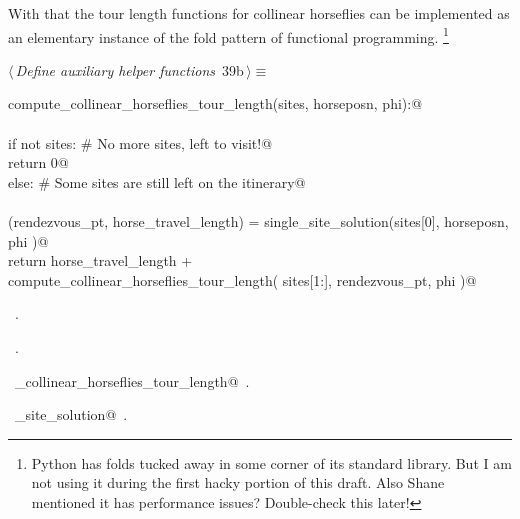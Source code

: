 \documentclass[11.5pt]{report}
\begin{document}
\vspace{-0.8cm}
With that the tour length functions for collinear horseflies can be implemented as 
an elementary instance of the fold pattern of functional programming. 
\footnote{Python has folds tucked away in some corner of its standard library. 
But I am not using it during the first hacky portion of this draft. Also Shane 
mentioned it has performance issues? Double-check this later!}


\begin{flushleft} \small\label{scrap56}\raggedright\small
{} $\langle\,${\itshape Define auxiliary helper functions}\nobreak\ {\footnotesize {39b}}$\,\rangle\equiv$
\vspace{-1ex}
\begin{list}{}{} \item
\mbox{}\verb@def compute_collinear_horseflies_tour_length(sites, horseposn, phi):@\\
\mbox{}\verb@@\\
\mbox{}\verb@     if not sites: # No more sites, left to visit!@\\
\mbox{}\verb@          return 0@\\
\mbox{}\verb@     else:         # Some sites are still left on the itinerary@\\
\mbox{}\verb@@\\
\mbox{}\verb@          (rendezvous_pt, horse_travel_length) = single_site_solution(sites[0], horseposn, phi )@\\
\mbox{}\verb@          return horse_travel_length  + \@\\
\mbox{}\verb@                 compute_collinear_horseflies_tour_length( sites[1:], rendezvous_pt, phi )@\\
\mbox{}\verb@@{\NWsep}
\end{list}
\vspace{-1.5ex}
\footnotesize
\begin{list}{}{\setlength{\itemsep}{-\parsep}\setlength{\itemindent}{-\leftmargin}}
\item \NWtxtMacroDefBy\ .
\item \NWtxtMacroRefIn\ .
\item \NWtxtIdentsDefed\nobreak\  \verb@compute_collinear_horseflies_tour_length@\nobreak\ .\item \NWtxtIdentsUsed\nobreak\  \verb@single_site_solution@\nobreak\ .
\item{}
\end{list}
\vspace{4ex}
\end{flushleft}
\end{document}
